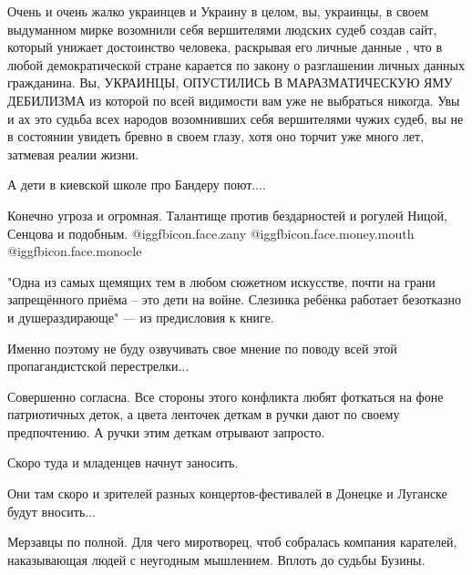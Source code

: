 \begin{itemize}
\begin{itemize}
\end{itemize} %


Очень и очень жалко украинцев и Украину в целом, вы, украинцы, в своем
выдуманном мирке возомнили себя вершителями людских судеб создав сайт, который
унижает достоинство человека, раскрывая его личные данные , что в любой
демократической стране карается по закону о разглашении личных данных
гражданина. Вы, УКРАИНЦЫ, ОПУСТИЛИСЬ В МАРАЗМАТИЧЕСКУЮ ЯМУ ДЕБИЛИЗМА из которой
по всей видимости вам уже не выбраться никогда. Увы и ах это судьба всех
народов возомнивших себя вершителями чужих судеб, вы не в состоянии увидеть
бревно в своем глазу, хотя оно торчит уже много лет, затмевая реалии жизни.

А дети в киевской школе про Бандеру поют....


Конечно угроза и огромная. Талантище против бездарностей и рогулей Ницой,
Сенцова и подобным.  @igg{fbicon.face.zany}  @igg{fbicon.face.money.mouth}
@igg{fbicon.face.monocle} 


"Одна из самых щемящих тем в любом сюжетном искусстве, почти на грани
запрещённого приёма – это дети на войне. Слезинка ребёнка работает безотказно и
душераздирающе" — из предисловия к книге.

Именно поэтому не буду озвучивать свое мнение по поводу всей этой
пропагандистской перестрелки...

\begin{itemize} %

Совершенно согласна. Все стороны этого конфликта любят фоткаться на фоне
патриотичных деток, а цвета ленточек деткам в ручки дают по своему
предпочтению. А ручки этим деткам отрывают запросто.

\end{itemize} %


Скоро туда и младенцев начнут заносить.


Они там скоро и зрителей разных концертов-фестивалей в Донецке и Луганске будут
вносить...


Мерзавцы по полной. Для чего миротворец, чтоб собралась компания карателей,
наказывающая людей с неугодным мышлением. Вплоть до судьбы Бузины.

\end{itemize} %
